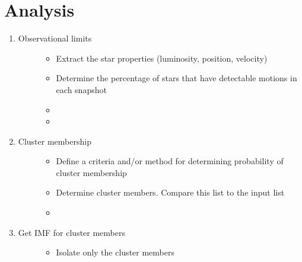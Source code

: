 \documentclass[letterpaper,10pt,english]{sphinxmanual}
\begin{document}
\section{Analysis}
\label{\detokenize{Project_Overview/Tasks:analysis}}\begin{enumerate}
%
\item {} \begin{description}
\item[{Observational limits}] \leavevmode\begin{itemize}
\item {} 
\sphinxAtStartPar
Extract the star properties (luminosity, position, velocity)

\item {} 
\sphinxAtStartPar
Determine the percentage of stars that have detectable motions in each snapshot

\item {} 
\sphinxAtStartPar
{}

\item {} 
\sphinxAtStartPar
{}

\end{itemize}

\end{description}

\item {} \begin{description}
\item[{Cluster membership}] \leavevmode\begin{itemize}
\item {} 
\sphinxAtStartPar
Define a criteria and/or method for determining probability of cluster membership

\item {} 
\sphinxAtStartPar
Determine cluster members. Compare this list to the input list

\item {} 
\sphinxAtStartPar
{}

\end{itemize}

\end{description}

\item {} \begin{description}
\item[{Get IMF for cluster members}] \leavevmode\begin{itemize}
\item {} 
\sphinxAtStartPar
Isolate only the cluster members


\end{itemize}
\end{description}
\end{enumerate}
\end{document}
